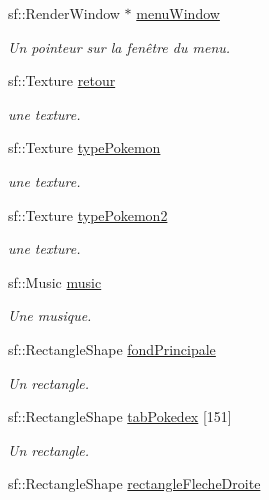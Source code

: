 \begin{DoxyCompactItemize}
\item 
sf\+::\+Render\+Window $\ast$ \hyperlink{class_s_f_m_l_pokedex_ab1c7f0857b4d7ca6b7d908684d5bd834}{menu\+Window}
\begin{DoxyCompactList}\small\item\em Un pointeur sur la fenêtre du menu. \end{DoxyCompactList}\item 
sf\+::\+Texture \hyperlink{class_s_f_m_l_pokedex_a74225d2a42d36a1914a45325bc36fa6e}{retour}
\begin{DoxyCompactList}\small\item\em une texture. \end{DoxyCompactList}\item 
sf\+::\+Texture \hyperlink{class_s_f_m_l_pokedex_a4ef635a4200985034d8b0f8c1cc200b8}{type\+Pokemon}
\begin{DoxyCompactList}\small\item\em une texture. \end{DoxyCompactList}\item 
sf\+::\+Texture \hyperlink{class_s_f_m_l_pokedex_abd3915db6d7443e178ee3e70c5759169}{type\+Pokemon2}
\begin{DoxyCompactList}\small\item\em une texture. \end{DoxyCompactList}\item 
sf\+::\+Music \hyperlink{class_s_f_m_l_pokedex_a1ef2187090948d629a72070792240799}{music}
\begin{DoxyCompactList}\small\item\em Une musique. \end{DoxyCompactList}\item 
sf\+::\+Rectangle\+Shape \hyperlink{class_s_f_m_l_pokedex_a8f77186aadf9a6ff658ab2e2dfb3fe8e}{fond\+Principale}
\begin{DoxyCompactList}\small\item\em Un rectangle. \end{DoxyCompactList}\item 
sf\+::\+Rectangle\+Shape \hyperlink{class_s_f_m_l_pokedex_aeb5376123a919717951f1d8a68fae12f}{tab\+Pokedex} \mbox{[}151\mbox{]}
\begin{DoxyCompactList}\small\item\em Un rectangle. \end{DoxyCompactList}\item 
sf\+::\+Rectangle\+Shape \hyperlink{class_s_f_m_l_pokedex_a1ab75884d1bfab5c12a6392c5a432804}{rectangle\+Fleche\+Droite}

\end{DoxyCompactItemize}
